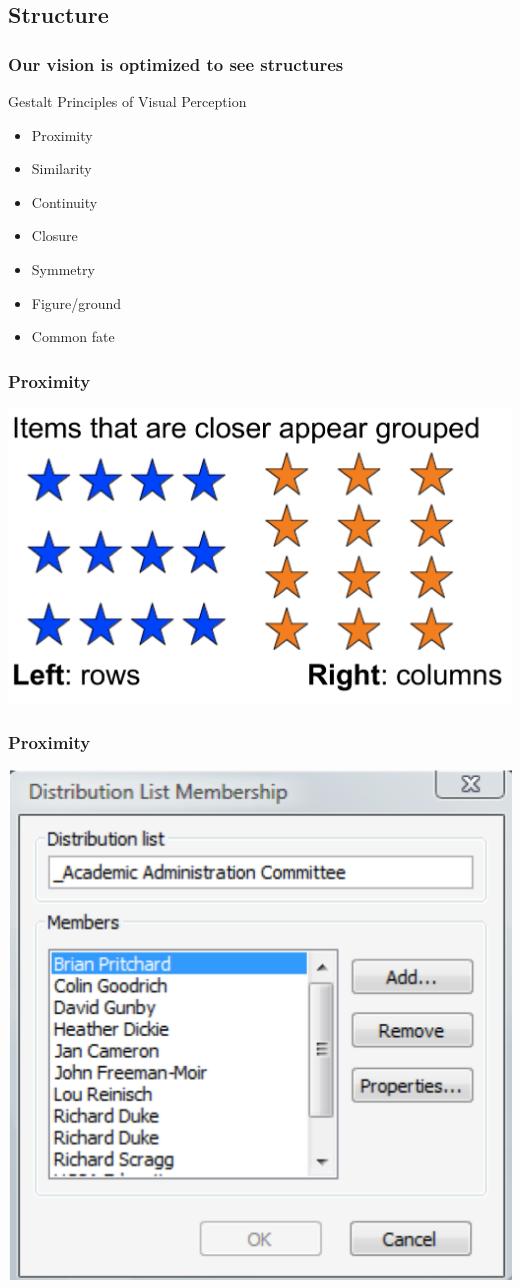 \documentclass{beamer}
\begin{document}
\subsection{Structure}

\begin{frame}
\frametitle{Our vision is optimized to see structures}
Gestalt Principles of Visual Perception
\begin{itemize}
\item Proximity
\item Similarity
\item Continuity
\item Closure
\item Symmetry
\item Figure/ground
\item Common fate
\end{itemize}
\end{frame}


\begin{frame}
\frametitle{Proximity}
\centering
\includegraphics[width=0.8\linewidth]{image/proximity}
\end{frame}

\begin{frame}
\frametitle{Proximity}
\centering
\includegraphics[width=0.5\linewidth]{image/proximity2}
\end{frame}
\end{document}

